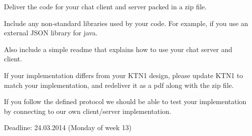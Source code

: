 Deliver the code for your chat client and server packed in a zip file. 

Include any non-standard libraries used by your code. For example, if you use an external 
JSON library for java. 

Also include a simple readme that explains how to use your chat server and client. 

If your implementation differs from your KTN1 design, please update KTN1 to match your 
implementation, and redeliver it as a pdf along with the zip file. 

If you follow the defined protocol we should be able to test your implementation by connecting to our own client/server implementation. 

Deadline: 24.03.2014 (Monday of week 13)
